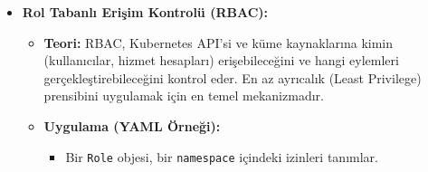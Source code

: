 \begin{itemize}
    \item \textbf{Rol Tabanlı Erişim Kontrolü (RBAC):}
    \begin{itemize}
        \item \textbf{Teori:} RBAC, Kubernetes API'si ve küme kaynaklarına kimin (kullanıcılar, hizmet hesapları) erişebileceğini ve hangi eylemleri gerçekleştirebileceğini kontrol eder. En az ayrıcalık (Least Privilege) prensibini uygulamak için en temel mekanizmadır.
        \item \textbf{Uygulama (YAML Örneği):}
            \begin{itemize}
                \item Bir \texttt{Role} objesi, bir \texttt{namespace} içindeki izinleri tanımlar. 
                

\end{itemize}
\end{itemize}
\end{itemize}
